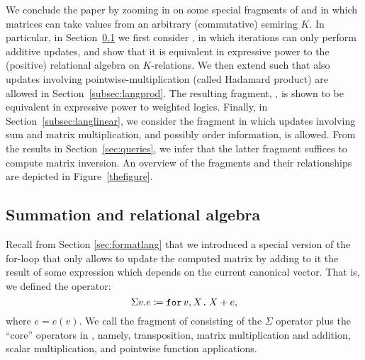 We conclude the paper by zooming in on some special fragments of \langfor and in which matrices can take values from an arbitrary (commutative) semiring $K$. In particular, in Section~\ref{ss:sumML} we first consider \langsum, in which iterations can only perform
additive updates, and show that it is equivalent in expressive power to the (positive)
relational algebra on $K$-relations. We then extend \langsum such that also updates involving pointwise-multiplication (called Hadamard product) are allowed in Section~\ref{subsec:langprod}. The resulting fragment, \langprod, is shown to be equivalent in expressive power to weighted logics. Finally, in Section~\ref{subsec:langlinear}, we consider the fragment \langmprod in which updates involving sum and matrix multiplication, and possibly order information, is allowed. From the results in Section~\ref{sec:queries}, we infer that the latter fragment suffices to compute matrix inversion. An overview of the fragments and their relationships are depicted in Figure~\ref{thefigure}.

\subsection{Summation \lang and relational algebra}
\label{ss:sumML}

Recall from Section \ref{sec:formatlang} that we introduced a special version of the for-loop that only allows to update the computed matrix by adding to it the result of some expression which depends on the current canonical vector. 
  That is, we defined the operator:
$$\Sigma v. e \coloneqq  \texttt{for}\, v,X \texttt{.}\, X + e,$$
where $e = e(v)$. We call \langsum the fragment of \langfor consisting of 
 the $\Sigma$ operator plus the ``core'' operators in \lang, namely, transposition, matrix multiplication and addition, scalar multiplication, and pointwise function applications.

